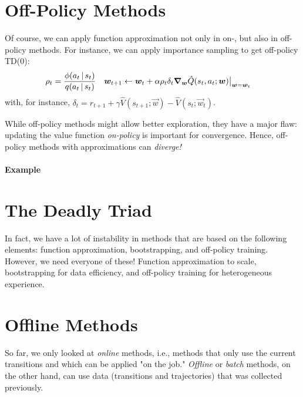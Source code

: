 	\section{Off-Policy Methods}
		Of course, we can apply function approximation not only in on-, but also in off-policy methods. For instance, we can apply importance sampling to get off-policy \acs{TD}(\(0\)):
		\begin{align}
			\rho_t &= \frac{\phi(a_t \,\vert\, s_t)}{q(a_t \,\vert\, s_t)} &
			\bm{w}_{t + 1} &\gets \bm{w}_t + \alpha \rho_t \delta_t \grad_{\bm{w}} \hat{Q}(s_t, a_t; \bm{w}) \bigr\rvert_{\bm{w} = \bm{w}_t}
		\end{align}
		with, for instance, \( \delta_t = r_{t + 1} + \gamma \hat{V}(s_{t + 1}; \vec{w}) - \hat{V}(s_t; \vec{w}_t) \).

		While off-policy methods might allow better exploration, they have a major flaw: updating the value function \emph{on-policy} is important for convergence. Hence, off-policy methods with approximations can \emph{diverge!}

		\paragraph{Example}

	\section{The Deadly Triad}
		\label{sec:deadlyTriad}

		In fact, we have a lot of instability in methods that are based on the following elements: function approximation, bootstrapping, and off-policy training. However, we need everyone of these! Function approximation to scale, bootstrapping for data efficiency, and off-policy training for heterogeneous experience.

	\section{Offline Methods}
		So far, we only looked at \emph{online} methods, i.e., methods that only use the current transitions and which can be applied "on the job." \emph{Offline} or \emph{batch} methods, on the other hand, can use data (transitions and trajectories) that was collected previously.

